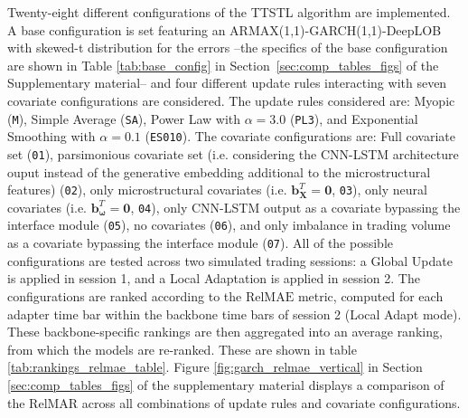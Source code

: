 \documentclass[10pt,a4paper,oneside]{article}
\begin{document}
Twenty-eight different configurations of the TTSTL algorithm are implemented. A base configuration is set featuring an ARMAX(1,1)-GARCH(1,1)-DeepLOB with skewed-t distribution for the errors --the specifics of the base configuration are shown in Table \ref{tab:base_config} in Section~\ref{sec:comp_tables_figs} of the Supplementary material-- and four different update rules interacting with seven covariate configurations are considered. The update rules considered are: Myopic (\verb|M|), Simple Average (\verb|SA|), Power Law with $\alpha = 3.0$ (\verb|PL3|), and Exponential Smoothing with $\alpha = 0.1$ (\verb|ES010|). The covariate configurations are: Full covariate set (\verb|01|), parsimonious covariate set (i.e. considering the CNN-LSTM architecture ouput instead of the generative embedding additional to the microstructural features) (\verb|02|), only microstructural covariates (i.e. $\mathbf{b}^T_{\mathbf{X}} = \mathbf{0}$, \verb|03|), only neural covariates (i.e. $\mathbf{b}^T_{\boldsymbol{\omega}} = \mathbf{0}$, \verb|04|), only CNN-LSTM output as a covariate bypassing the interface module (\verb|05|), no covariates (\verb|06|), and only imbalance in trading volume as a covariate bypassing the interface module (\verb|07|). All of the possible configurations are tested across two simulated trading sessions: a Global Update is applied in session 1, and a Local Adaptation is applied in session 2. The configurations are ranked according to the $\mathrm{RelMAE}$ metric, computed for each adapter time bar within the backbone time bars of session 2 (Local Adapt mode). These backbone-specific rankings are then aggregated into an average ranking, from which the models are re-ranked. These are shown in table \ref{tab:rankings_relmae_table}. Figure \ref{fig:garch_relmae_vertical} in Section \ref{sec:comp_tables_figs} of the supplementary material displays a comparison of the RelMAR across all combinations of update rules and covariate configurations.
\end{document}
